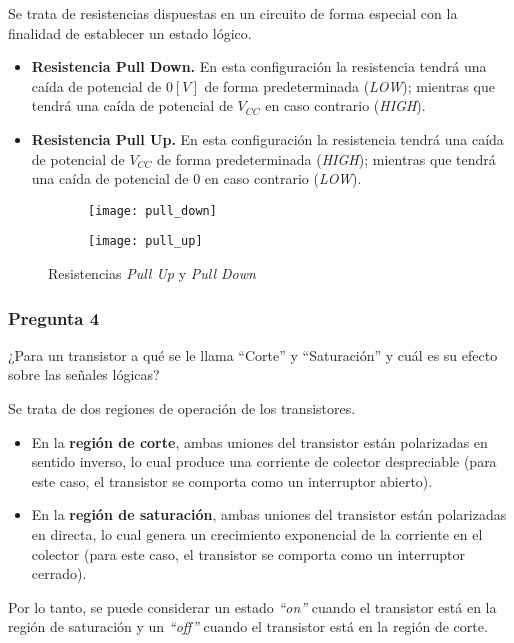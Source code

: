 \documentclass[../procedimientos.tex]{subfiles}
\begin{document}
Se trata de resistencias dispuestas en un circuito de forma especial con la 
finalidad de establecer un estado lógico.
\begin{itemize}
  \item \textbf{Resistencia Pull Down.} En esta configuración la resistencia 
    tendrá una caída de potencial de $0 [V]$ de forma predeterminada 
    (\textit{LOW}); mientras que tendrá una caída de potencial de $V_{CC}$ en 
    caso contrario (\textit{HIGH}).

  \item \textbf{Resistencia Pull Up.} En esta configuración la resistencia 
    tendrá una caída de potencial de $V_{CC}$ de forma predeterminada 
    (\textit{HIGH}); mientras que tendrá una caída de potencial de $0$ en caso 
    contrario (\textit{LOW}).
\end{itemize}

\begin{figure}[H]
  \centering
  \begin{subfigure}[b]{0.45\textwidth}
    \centering
    \texttt{[image: pull\_down]}
  \end{subfigure}
  \hfill
  \begin{subfigure}[b]{0.45\textwidth}
    \centering
    \texttt{[image: pull\_up]}
  \end{subfigure}
  \caption{Resistencias \textit{Pull Up} y \textit{Pull Down}}
\end{figure}

\subsubsection*{Pregunta 4}
\begin{em}
  ¿Para un transistor a qué se le llama ``Corte'' y ``Saturación'' y cuál es su 
  efecto sobre las señales lógicas?
\end{em}

Se trata de dos regiones de operación de los transistores.
\begin{itemize}
  \item En la \textbf{región de corte}, ambas uniones del transistor están 
    polarizadas en sentido inverso, lo cual produce una corriente de colector 
    despreciable (para este caso, el transistor se comporta como un 
    interruptor abierto).
  \item En la \textbf{región de saturación}, ambas uniones del transistor 
    están polarizadas en directa, lo cual genera un crecimiento exponencial de 
    la corriente en el colector (para este caso, el transistor se comporta 
    como un interruptor cerrado).
\end{itemize}
Por lo tanto, se puede considerar un estado \textit{``on''} cuando el 
transistor está en la región de saturación y un \textit{``off''} cuando el 
transistor está en la región de corte.
\end{document}
